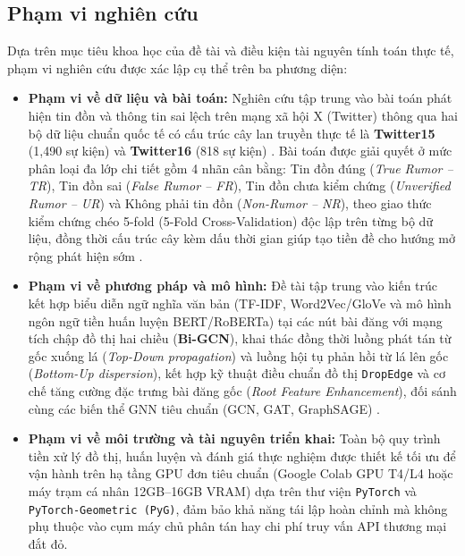 \documentclass[11pt,a4paper]{extreport}
\begin{document}
\subsection{Phạm vi nghiên cứu}
Dựa trên mục tiêu khoa học của đề tài và điều kiện tài nguyên tính toán thực tế, phạm vi nghiên cứu được xác lập cụ thể trên ba phương diện:
\begin{itemize}
    \item \textbf{Phạm vi về dữ liệu và bài toán:} Nghiên cứu tập trung vào bài toán phát hiện tin đồn và thông tin sai lệch trên mạng xã hội X (Twitter) thông qua hai bộ dữ liệu chuẩn quốc tế có cấu trúc cây lan truyền thực tế là \textbf{Twitter15} (1,490 sự kiện) và \textbf{Twitter16} (818 sự kiện) \cite{ma_detect_2017, noauthor_disinformation_2024}. Bài toán được giải quyết ở mức phân loại đa lớp chi tiết gồm 4 nhãn cân bằng: Tin đồn đúng (\textit{True Rumor -- TR}), Tin đồn sai (\textit{False Rumor -- FR}), Tin đồn chưa kiểm chứng (\textit{Unverified Rumor -- UR}) và Không phải tin đồn (\textit{Non-Rumor -- NR}), theo giao thức kiểm chứng chéo 5-fold (5-Fold Cross-Validation) độc lập trên từng bộ dữ liệu, đồng thời cấu trúc cây kèm dấu thời gian giúp tạo tiền đề cho hướng mở rộng phát hiện sớm \cite{noauthor_early_2025, noauthor_integrating_2025}.
    \item \textbf{Phạm vi về phương pháp và mô hình:} Đề tài tập trung vào kiến trúc kết hợp biểu diễn ngữ nghĩa văn bản (TF-IDF, Word2Vec/GloVe và mô hình ngôn ngữ tiền huấn luyện BERT/RoBERTa) tại các nút bài đăng với mạng tích chập đồ thị hai chiều (\textbf{Bi-GCN}), khai thác đồng thời luồng phát tán từ gốc xuống lá (\textit{Top-Down propagation}) và luồng hội tụ phản hồi từ lá lên gốc (\textit{Bottom-Up dispersion}), kết hợp kỹ thuật điều chuẩn đồ thị \texttt{DropEdge} và cơ chế tăng cường đặc trưng bài đăng gốc (\textit{Root Feature Enhancement}), đối sánh cùng các biến thể GNN tiêu chuẩn (GCN, GAT, GraphSAGE) \cite{noauthor_early_2025, noauthor_integrating_2025, noauthor_ensemble_2024}.
    \item \textbf{Phạm vi về môi trường và tài nguyên triển khai:} Toàn bộ quy trình tiền xử lý đồ thị, huấn luyện và đánh giá thực nghiệm được thiết kế tối ưu để vận hành trên hạ tầng GPU đơn tiêu chuẩn (Google Colab GPU T4/L4 hoặc máy trạm cá nhân 12GB--16GB VRAM) dựa trên thư viện \texttt{PyTorch} và \texttt{PyTorch-Geometric (PyG)}, đảm bảo khả năng tái lập hoàn chỉnh mà không phụ thuộc vào cụm máy chủ phân tán hay chi phí truy vấn API thương mại đắt đỏ.
\end{itemize}
\end{document}
